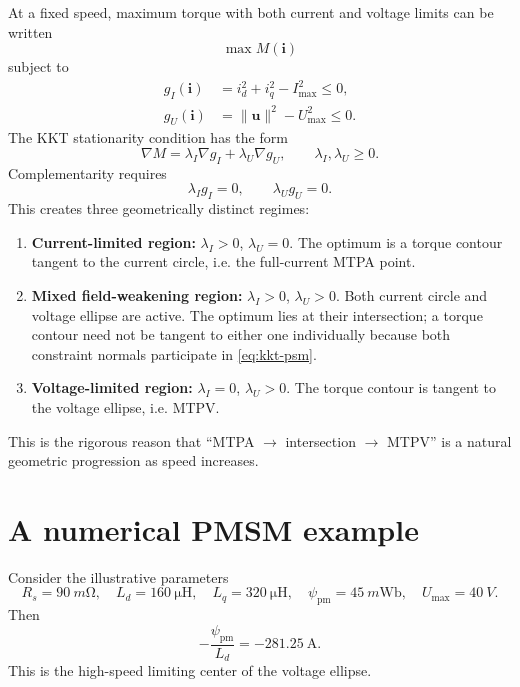 \documentclass[11pt,a4paper]{article}
\newcommand{\id}{i_d}
\newcommand{\iq}{i_q}
\newcommand{\Rs}{R_s}
\newcommand{\Ld}{L_d}
\newcommand{\Lq}{L_q}
\newcommand{\psipm}{\psi_{\mathrm{pm}}}
\newcommand{\Imax}{I_{\max}}
\newcommand{\Umax}{U_{\max}}
\newcommand{\vct}[1]{\bm{#1}}
\begin{document}
At a fixed speed, maximum torque with both current and voltage limits can be written
\begin{equation}
  \max M(\vct i)
\end{equation}
subject to
\begin{align}
  g_I(\vct i)&=\id^2+\iq^2-\Imax^2\le0,\\
  g_U(\vct i)&=\|\vct u\|^2-\Umax^2\le0.
\end{align}
The KKT stationarity condition has the form
\begin{equation}
  \nabla M
  =\lambda_I\nabla g_I+\lambda_U\nabla g_U,
  \qquad
  \lambda_I,\lambda_U\ge0.
  \label{eq:kkt-psm}
\end{equation}
Complementarity requires
\begin{equation}
  \lambda_I g_I=0,
  \qquad
  \lambda_U g_U=0.
\end{equation}
This creates three geometrically distinct regimes:

\begin{enumerate}
  \item \textbf{Current-limited region:} $\lambda_I>0$, $\lambda_U=0$. The optimum is a torque contour tangent to the current circle, i.e. the full-current MTPA point.
  \item \textbf{Mixed field-weakening region:} $\lambda_I>0$, $\lambda_U>0$. Both current circle and voltage ellipse are active. The optimum lies at their intersection; a torque contour need not be tangent to either one individually because both constraint normals participate in \eqref{eq:kkt-psm}.
  \item \textbf{Voltage-limited region:} $\lambda_I=0$, $\lambda_U>0$. The torque contour is tangent to the voltage ellipse, i.e. MTPV.
\end{enumerate}

This is the rigorous reason that ``MTPA $\rightarrow$ intersection $\rightarrow$ MTPV'' is a natural geometric progression as speed increases.

\section{A numerical PMSM example}

Consider the illustrative parameters
\begin{equation}
\Rs=\SI{90}{m\ohm},\quad
\Ld=\SI{160}{\micro\henry},\quad
\Lq=\SI{320}{\micro\henry},\quad
\psipm=\SI{45}{m\weber},\quad
\Umax=\SI{40}{V}.
\end{equation}
Then
\begin{equation}
  -\frac{\psipm}{\Ld}=-281.25\ \mathrm{A}.
\end{equation}
This is the high-speed limiting center of the voltage ellipse.
\end{document}
